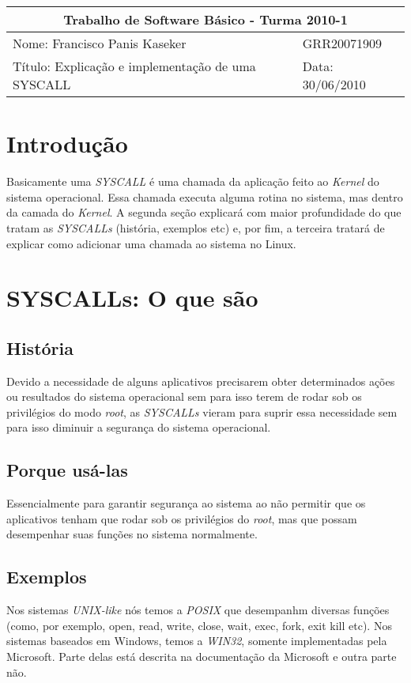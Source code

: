 \documentclass[12pt]{article}
\begin{document}
\setlength{\parskip}{2ex}

\begin{tabular}[l]{ | p{10cm} | l | }
	\hline \multicolumn{2}{|c|}{Trabalho de Software Básico - Turma 2010-1} \\
	\hline Nome: Francisco Panis Kaseker &
	GRR20071909 \\
	\hline Título: Explicação e implementação de uma SYSCALL &
	Data: 30/06/2010 \\
	\hline
\end{tabular}


\vspace{2cm}

\section{Introdução}

Basicamente uma \textit{SYSCALL} é uma chamada da aplicação feito ao \textit{Kernel} do
sistema operacional. Essa chamada executa alguma rotina no sistema, mas dentro
da camada do \textit{Kernel}. A segunda seção explicará com maior profundidade do
que tratam as \textit{SYSCALLs} (história, exemplos etc) e, por fim, a terceira
tratará de explicar como adicionar uma chamada ao sistema no Linux.

\section{SYSCALLs: O que são}

\subsection{História}
Devido a necessidade de alguns aplicativos precisarem obter determinados ações
ou resultados do sistema operacional sem para isso terem de rodar sob os
privilégios do modo \textit{root}, as \textit{SYSCALLs} vieram para suprir essa
necessidade sem para isso diminuir a segurança do sistema operacional.

\subsection{Porque usá-las}
Essencialmente para garantir segurança ao sistema ao não permitir que os
aplicativos tenham que rodar sob os privilégios do \textit{root}, mas que possam
desempenhar suas funções no sistema normalmente.

\subsection{Exemplos}
Nos sistemas \textit{UNIX-like} nós temos a \textit{POSIX} que desempanhm diversas funções (como,
por exemplo, open, read, write, close, wait, exec, fork, exit kill etc). Nos
sistemas baseados em Windows, temos a \textit{WIN32}, somente implementadas pela
Microsoft. Parte delas está descrita na documentação da Microsoft e outra parte
não.
\end{document}
